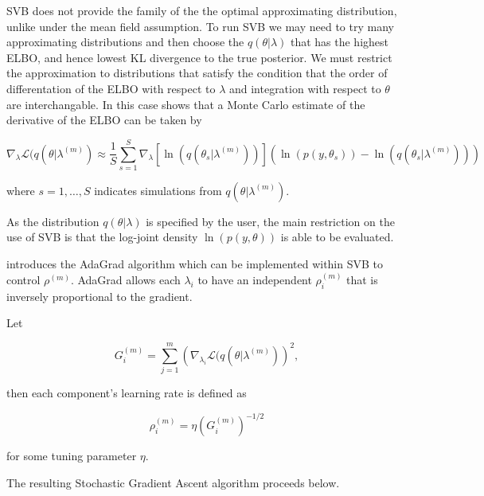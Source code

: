 \documentclass{article}\usepackage[]{graphicx}\usepackage[]{color}
\numberwithin{equation}{section}
\begin{document}
SVB does not provide the family of the the optimal approximating distribution, unlike under the mean field assumption. To run SVB we may need to try many approximating distributions and then choose the $q(\theta | \lambda)$ that has the highest ELBO, and hence lowest KL divergence to the true posterior. We must restrict the approximation to distributions that satisfy the condition that the order of differentation of the ELBO with respect to $\lambda$ and integration with respect to $\theta$ are interchangable. In this case \citet{Ranganath2014} shows that a Monte Carlo estimate of the derivative of the ELBO can be taken by

\begin{equation}
\label{SGA2}
\nabla_{\lambda}\mathcal{L}(q(\theta | \lambda^{(m)}) \approx \frac{1}{S}\sum_{s=1}^{S} \nabla_{\lambda} [\ln(q(\theta_s | \lambda^{(m)}))] (\ln (p(y, \theta_s)) - \ln(q(\theta_s | \lambda^{(m)})))
\end{equation}

where $s = 1, \dots, S$ indicates simulations from $q(\theta | \lambda^{(m)})$.

As the distribution $q(\theta | \lambda)$ is specified by the user, the main restriction on the use of SVB is that the log-joint density $\ln(p(y, \theta))$ is able to be evaluated.

\citet{Duchi2011} introduces the AdaGrad algorithm which can be implemented within SVB to control $\rho^{(m)}$. AdaGrad allows each $\lambda_i$ to have an independent $\rho^{(m)}_i$ that is inversely proportional to the gradient. 

Let 

\begin{equation}
\label{SGA3}
G_i^{(m)} = \sum_{j = 1}^{m} \left(\nabla_{\lambda_i}\mathcal{L}(q(\theta | \lambda^{(m)})\right)^2,
\end{equation}

then each component's learning rate is defined as

\begin{equation}
\label{SGA4}
\rho^{(m)}_i = \eta \left(G_i^{(m)}\right)^{-1/2}
\end{equation}

for some tuning parameter $\eta$.

The resulting Stochastic Gradient Ascent algorithm proceeds below.
\end{document}
